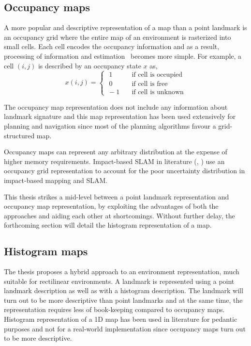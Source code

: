 \subsection{Occupancy maps}
A more popular and descriptive representation of a map than a point landmark is an occupancy grid where the entire map of an environment is rasterized into small cells. Each cell encodes the occupancy information and as a result, processing of information and estimation~\cite{thrun2005probabilistic} becomes more simple. For example, a cell $(i,j)$ is described by an occupancy state $x$ as,
\[ x(i,j) = \begin{cases}\,\,1 & \quad \text{if } \text{cell is occupied}\\ \,\,0 & \quad \text{if } \text{cell is free}\\ \,-1 & \quad \text{if } \text{cell is unknown} \end{cases} \] 

The occupancy map representation does not include any information about landmark signature and this map representation has been used extensively for planning and navigation since most of the planning algorithms favour a grid-structured map.

Occupancy maps can represent any arbitrary distribution at the expense of higher memory requirements. Impact-based SLAM in literature (\cite{fox2012tactile}, \cite{fox2012towards}) use an occupancy grid representation to account for the poor uncertainty distribution in impact-based mapping and SLAM. 

This thesis strikes a mid-level between a point landmark representation and occupancy map representation, by exploiting the advantages of both the approaches and aiding each other at shortcomings. Without further delay, the forthcoming section will detail the histogram representation of a map.

\subsection{Histogram maps} \label{sec::hist_map}
The thesis proposes a hybrid approach to an environment representation, much suitable for rectilinear environments. A landmark is represented using a point landmark description as well as with a histogram description. The landmark will turn out to be more descriptive than point landmarks and at the same time, the representation requires less of book-keeping compared to occupancy maps. Histogram representation of a 1D map has been used in literature \cite{thrun2005probabilistic} for pedantic purposes and not for a real-world implementation since occupancy maps turn out to be more descriptive.

